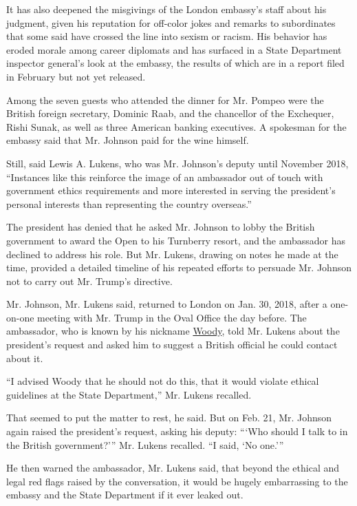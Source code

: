 It has also deepened the misgivings of the London embassy's staff about
his judgment, given his reputation for off-color jokes and remarks to
subordinates that some said have crossed the line into sexism or racism.
His behavior has eroded morale among career diplomats and has surfaced
in a State Department inspector general's look at the embassy, the
results of which are in a report filed in February but not yet released.

Among the seven guests who attended the dinner for Mr. Pompeo were the
British foreign secretary, Dominic Raab, and the chancellor of the
Exchequer, Rishi Sunak, as well as three American banking executives. A
spokesman for the embassy said that Mr. Johnson paid for the wine
himself.

Still, said Lewis A. Lukens, who was Mr. Johnson's deputy until November
2018, ``Instances like this reinforce the image of an ambassador out of
touch with government ethics requirements and more interested in serving
the president's personal interests than representing the country
overseas.''

The president has denied that he asked Mr. Johnson to lobby the British
government to award the Open to his Turnberry resort, and the ambassador
has declined to address his role. But Mr. Lukens, drawing on notes he
made at the time, provided a detailed timeline of his repeated efforts
to persuade Mr. Johnson not to carry out Mr. Trump's directive.

Mr. Johnson, Mr. Lukens said, returned to London on Jan. 30, 2018, after
a one-on-one meeting with Mr. Trump in the Oval Office the day before.
The ambassador, who is known by his nickname
\href{https://www.nytimes3xbfgragh.onion/2020/07/25/sports/football/woody-johnson-trump-jets.html}{Woody},
told Mr. Lukens about the president's request and asked him to suggest a
British official he could contact about it.

``I advised Woody that he should not do this, that it would violate
ethical guidelines at the State Department,'' Mr. Lukens recalled.

That seemed to put the matter to rest, he said. But on Feb. 21, Mr.
Johnson again raised the president's request, asking his deputy: ```Who
should I talk to in the British government?''' Mr. Lukens recalled. ``I
said, `No one.'''

He then warned the ambassador, Mr. Lukens said, that beyond the ethical
and legal red flags raised by the conversation, it would be hugely
embarrassing to the embassy and the State Department if it ever leaked
out.

